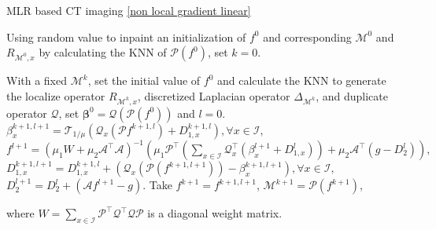 \documentclass[letterpaper,10pt]{article}
\begin{document}
\begin{algorithm}

\caption{MLR based CT imaging \eqref{non local gradient linear} }
\label{alg:SuperResolution}
\begin{algorithmic}

 Using random value to inpaint an initialization of $f^0$ and corresponding $\mathcal{M}^0$ and $R_{\mathcal{M}^0,x}$ by calculating the KNN of $\mathcal{P}(f^0)$, set $k=0$.

 With a fixed $\mathcal{M}^k$, set the initial value of $f^0$ and calculate the KNN to generate the localize operator $R_{\mathcal{M}^k,x}$, discretized Laplacian operator $\Delta_{\mathcal{M}^k}$, and duplicate operator $\mathcal{Q}$, set $\bm{\beta}^0 = \mathcal{Q} (\mathcal{P} (f^0))$ and $l=0$.
  $\beta_x^{k+1,l+1} = \mathcal{T}_{1/\mu} (\mathcal{Q}_x (\mathcal{P} f^{k+1,l}) +D_{1,x}^{k+1,l}), \forall x \in \mathscr{I},$
 $f^{l+1} = (\mu_1 W + \mu_2 \mathcal{A}^{\top} \mathcal{A})^{-1}(\mu_1 \mathcal{P}^{\top} (\sum_{x \in \mathscr{I}}  {\mathcal{Q}_x^{\top}}({\beta}_x^{l+1} +D_{1,x}^{l}))+\mu_2 \mathcal{A}^{\top} (g - D_2^l)),$
 $D_{1,x}^{k+1,l+1} = D_{1,x}^{k+1,l} + (\mathcal{Q}_x(\mathcal{P}(f^{k+1,l+1}))-\beta_x^{k+1,l+1}), \forall x \in \mathscr{I},$
 $D_2^{l+1} = D_2^{l} + (\mathcal{A} f^{l+1} - g).$
\ENDWHILE
{} Take $f^{k+1} = f^{k+1,l+1}$,
 $\mathcal{M}^{k+1} = \mathcal{P}(f^{k+1})$,
\ENDWHILE

where $W = \sum_{x \in \mathscr{I}} \mathcal{P}^{\top} \mathcal{Q}^{\top} \mathcal{Q} \mathcal{P}$ is a diagonal weight matrix.



\end{algorithmic}
\end{algorithm}
\end{document}
